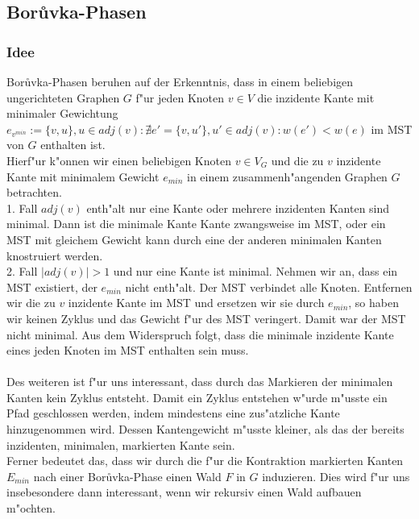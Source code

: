 \subsection{Bor\r uvka-Phasen}

\subsubsection{Idee}
\label{sec:borIdea}

Bor\r uvka-Phasen beruhen auf der Erkenntnis, dass in einem beliebigen 
    ungerichteten Graphen $G$ f"ur jeden Knoten $v \in V$ die inzidente Kante mit 
    minimaler Gewichtung 
    $e_{v^{min}} := \{v, u\}, u \in adj(v): 
        \nexists e' = \{v, u'\}, u' \in adj(v): w(e') < w(e)$
    im MST von $G$ enthalten ist.\\
Hierf"ur k"onnen wir einen beliebigen Knoten $v \in V_G$ und die zu $v$ inzidente
    Kante mit minimalem Gewicht $e_{min}$ in einem 
    zusammenh"angenden Graphen $G$ betrachten.\\
1. Fall $adj(v)$ enth"alt nur eine Kante oder mehrere inzidenten Kanten sind minimal. 
    Dann ist die minimale Kante Kante zwangsweise im 
    MST, oder ein MST mit gleichem Gewicht kann durch eine der anderen minimalen
    Kanten knostruiert werden.\\
2. Fall $|adj(v)| > 1$ und nur eine Kante ist minimal. 
    Nehmen wir an, dass ein MST existiert, der $e_{min}$ 
    nicht enth"alt. 
    Der MST verbindet alle Knoten.
    Entfernen wir die zu $v$ inzidente Kante im MST
    und ersetzen wir sie durch $e_{min}$, so haben wir keinen Zyklus und das
    Gewicht f"ur des MST veringert. 
    Damit war der MST nicht minimal.
    Aus dem Widerspruch folgt, dass die minimale inzidente Kante eines jeden
    Knoten im MST enthalten sein muss.\\
\\
Des weiteren ist f"ur uns interessant, dass durch das Markieren der minimalen
    Kanten kein Zyklus entsteht. 
    Damit ein Zyklus entstehen w"urde m"usste ein Pfad geschlossen werden, 
    indem mindestens eine zus"atzliche Kante hinzugenommen wird. 
    Dessen Kantengewicht m"usste kleiner, als das der bereits inzidenten, 
    minimalen, markierten Kante sein.\\
Ferner bedeutet das, dass wir durch die f"ur die Kontraktion markierten Kanten
    $E_{min}$ nach einer Bor\r uvka-Phase einen Wald $F$ in $G$ induzieren.
    Dies wird f"ur uns insebesondere dann interessant, wenn
    wir rekursiv einen Wald aufbauen m"ochten.\\
